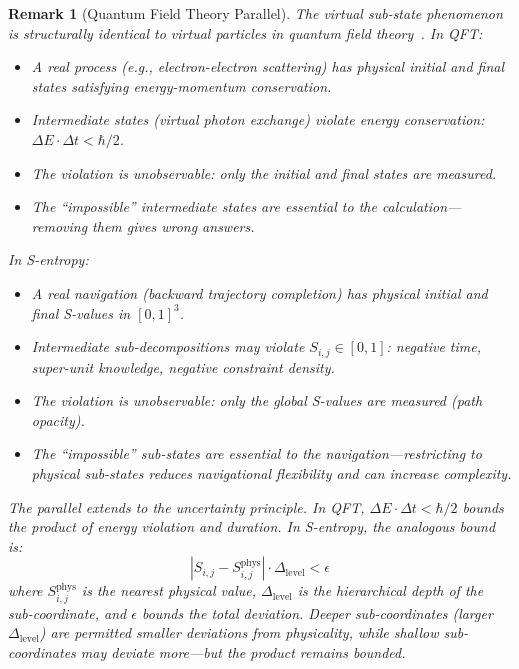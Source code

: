 \documentclass[12pt,twocolumn]{article}
\newtheorem{remark}{Remark}[section]
\begin{document}
\begin{remark}[Quantum Field Theory Parallel]
\label{rem:qft}
The virtual sub-state phenomenon is structurally identical to virtual particles in quantum field theory~\cite{hatfield1992quantum}. In QFT:
\begin{itemize}
\item A real process (e.g., electron-electron scattering) has physical initial and final states satisfying energy-momentum conservation.
\item Intermediate states (virtual photon exchange) violate energy conservation: $\Delta E \cdot \Delta t < \hbar/2$.
\item The violation is unobservable: only the initial and final states are measured.
\item The ``impossible'' intermediate states are essential to the calculation---removing them gives wrong answers.
\end{itemize}

In S-entropy:
\begin{itemize}
\item A real navigation (backward trajectory completion) has physical initial and final S-values in $[0,1]^3$.
\item Intermediate sub-decompositions may violate $S_{i,j} \in [0,1]$: negative time, super-unit knowledge, negative constraint density.
\item The violation is unobservable: only the global S-values are measured (path opacity).
\item The ``impossible'' sub-states are essential to the navigation---restricting to physical sub-states reduces navigational flexibility and can increase complexity.
\end{itemize}

The parallel extends to the uncertainty principle. In QFT, $\Delta E \cdot \Delta t < \hbar/2$ bounds the product of energy violation and duration. In S-entropy, the analogous bound is:
\begin{equation}
\label{eq:s_uncertainty}
|S_{i,j} - S_{i,j}^{\text{phys}}| \cdot \Delta_{\text{level}} < \epsilon
\end{equation}
where $S_{i,j}^{\text{phys}}$ is the nearest physical value, $\Delta_{\text{level}}$ is the hierarchical depth of the sub-coordinate, and $\epsilon$ bounds the total deviation. Deeper sub-coordinates (larger $\Delta_{\text{level}}$) are permitted smaller deviations from physicality, while shallow sub-coordinates may deviate more---but the product remains bounded.
\end{remark}
\end{document}
